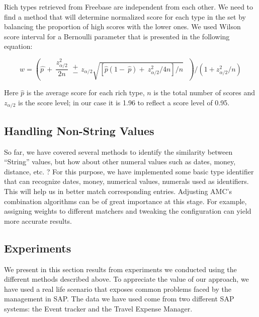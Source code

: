 Rich types retrieved from Freebase are independent from each other. We need to find a method that will determine normalized score for each type in the set by balancing the proportion of high scores with the lower ones. We used Wilson score interval for a Bernoulli parameter that is presented in the following equation:

\begin{equation}\label{equation:equation_10}
w={\left(\widehat{p\ }+\ \frac{z^2_{{\alpha }/{2}}}{2n}\  \begin{array}{c}
+ \\
- \end{array}
z_{{\alpha }/{2}}\sqrt{{\left[\hat{p}\left(1-\ \hat{p}\right)+\ {z^2_{{\alpha }/{2}}}/{4n}\right]}/{n}}\ \ \ \right)}/{\left(1+{z^2_{{\alpha }/{2}}}/{n}\right)}
\end{equation}

Here $\hat{p}$ is the average score for each rich type, $n$ is the total number of scores and $z_{{\alpha }/{2}}$ is the score level; in our case it is 1.96 to reflect a score level of 0.95.

\subsection{Handling Non-String Values}

So far, we have covered several methods to identify the similarity between ``String'' values, but how about other numeral values such as dates, money, distance, etc. ? For this purpose, we have implemented some basic type identifier that can recognize dates, money, numerical values, numerals used as identifiers. This will help us in better match corresponding entries. Adjusting AMC's combination algorithms can be of great importance at this stage. For example, assigning weights to different matchers and tweaking the configuration can yield more accurate results.



\subsection{Experiments}
We present in this section results from experiments we conducted using the different methods described above. To appreciate the value of our approach, we have used a real life scenario that exposes common problems faced by the management in SAP. The data we have used come from two different SAP systems: the Event tracker and the Travel Expense Manager.

